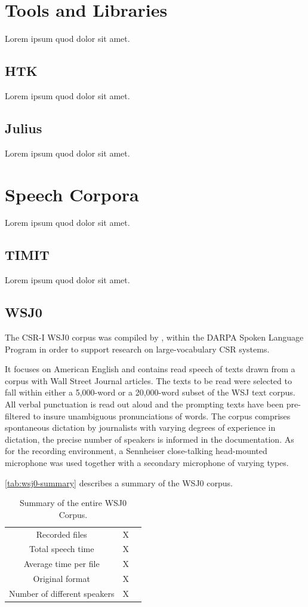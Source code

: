 \section{Tools and Libraries}
Lorem ipsum quod dolor sit amet.

\subsection{HTK}
Lorem ipsum quod dolor sit amet.

\subsection{Julius}
Lorem ipsum quod dolor sit amet.

\section{Speech Corpora}
Lorem ipsum quod dolor sit amet.

\subsection{TIMIT}
Lorem ipsum quod dolor sit amet.

\subsection{WSJ0}
The CSR-I WSJ0 corpus was compiled by \citeauthor{Garofolo1993} \cite{Garofolo1993}, within the 
DARPA Spoken Language Program in order to support research on large-vocabulary \ac{CSR} systems.

It focuses on American English and contains read speech of texts drawn from a corpus with Wall 
Street Journal articles. The texts to be read were selected to fall within either a 5,000-word or 
a 20,000-word subset of the WSJ text corpus. All verbal punctuation is read out aloud and the 
prompting texts have been pre-filtered to insure unambiguous pronunciations of words. The corpus 
comprises spontaneous dictation by journalists with varying degrees of experience in dictation, 
the precise number of speakers is informed in the documentation. As for the recording environment, 
a Sennheiser close-talking head-mounted microphone was used together with a secondary microphone of 
varying types.  

\autoref{tab:wsj0-summary} describes a summary of the WSJ0 corpus.

\begin{table}[H]
\caption[Summary of the entire WSJ0 Corpus.]{Summary of the entire WSJ0 Corpus.}
\smallskip
\centering
\begin{tabular}{ccc} \toprule
  Recorded files & X \\
  Total speech time & X \\
  Average time per file & X \\
  Original format & X \\
  Number of different speakers & X \\
  \bottomrule
\end{tabular}
\label{tab:wsj0-summary}
\end{table}

